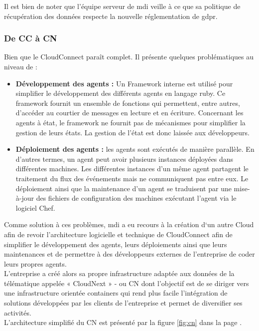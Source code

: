         Il est bien de noter que l'équipe serveur de \gls{mdi} veille à ce que sa politique de récupération des données 
        respecte la nouvelle réglementation de \gls{gdpr}\cite{gdpr}. 
      
    
    \subsubsection{De \gls{CC} à \gls{CN}}

       Bien que le CloudConnect paraît complet. Il présente quelques problématiques au niveau de : 
       \begin{itemize}
        \renewcommand{\labelitemi}{$\bullet$}
            \item \textbf{Développement des agents :} Un Framework interne est utilisé pour simplifier le développement des différents 
        agents en langage ruby. Ce framework fournit un ensemble de fonctions qui permettent, entre autres, d’accéder au 
        courtier de messages en lecture et en écriture. Concernant les agents à état, le framework ne fournit pas 
        de mécanismes pour simplifier la gestion de leurs états. La gestion de l’état est donc laissée aux développeurs.\\[0.3cm]
            \item \textbf{Déploiement des agents :} les agents sont exécutés de manière parallèle. En d’autres termes, un agent peut avoir 
        plusieurs instances déployées dans différentes machines. Les différentes instances d’un même agent partagent 
        le traitement du flux des événements mais ne communiquent pas entre eux. Le déploiement ainsi que la maintenance 
        d’un agent se traduisent par une mise-à-jour des fichiers de configuration des machines exécutant l’agent via le logiciel Chef.\\ [0.3cm]
    \end{itemize}

         Comme solution à ces problèmes, \gls{mdi} a eu recours à la création d‘un autre Cloud afin de revoir l’architecture 
        logicielle et technique de CloudConnect afin de simplifier le développement des agents, leurs déploiements 
        ainsi que leurs maintenances et de permettre à des développeurs externes de l’entreprise de coder leurs propres agents.\\
        L'entreprise a créé alors sa propre infrastructure adaptée aux données de la télématique appelée « CloudNext » - ou  \gls{CN} 
        dont l’objectif est de se diriger vers une infrastructure orientée containers qui rend plus facile l’intégration de 
        solutions développées par les clients de l’entreprise et permet de diversifier ses activités.\\ [0.3cm] 
        L'architecture simplifié du \gls{CN} est présenté par la figure \ref{fig:cn} dans la page \pageref{fig:cn}.



